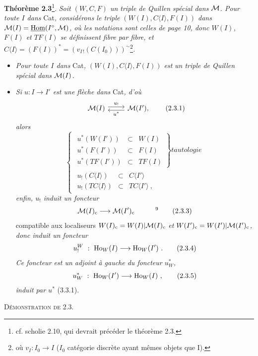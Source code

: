 \textbf{Théorème 2.3}\footnote[7]{cf. scholie 2.10, qui devrait précéder le théorème 2.3.}. \textit{Soit $(W,C,F)$ un triple de Quillen spécial dans $\mathcal{M}$. Pour toute $I$ dans} Cat\textit{, considérons le triple $(W(I),C\langle I\rangle,F(I))$ dans $\mathcal{M}(I) = \underline{\mathrm{Hom}}(I^{\circ},\mathcal{M})$, où les notations sont celles de page 10, donc $W(I)$, $F(I)$ et $TF(I)$ se définissent fibre par fibre, et $C\langle I\rangle = (F(I))^* = (v_{I\,!}(C(I_0)))^{\sim}$}\footnote[8]{où $v_I : I_0 \longrightarrow I$ ($I_0$ catégorie discrète ayant mêmes objets que I).}\textit{.}
\begin{itemize}
\item[1°)] \textit{Pour toute $I$ dans} Cat\textit{, $(W(I),C\langle I\rangle,F(I))$ est}
\textit{un triple de Quillen spécial dans $\mathcal{M}(I)$.}
\item[2°)] \textit{Si $u : I \longrightarrow I'$ est une flèche dans} Cat\textit{, d'où}
\[
\begin{tikzcd}
\M(I) \arrow[r, shift left, "u_!"] & \M(I'), \arrow[l, shift left, "u^*"]
\end{tikzcd}
\tag*{(2.3.1)}
\]
\textit{alors}
\[
\left\{
\begin{array}{l}
\left.\begin{array}{rcl}
u^*(W(I')) & \subset & W(I)\\
u^*(F(I')) & \subset & F(I)\\
u^*(TF(I')) & \subset & TF(I)
\end{array}\right\}\textit{tautologie}\\
\begin{array}{rcl}
u_!(C\langle I\rangle) & \subset & C\langle I'\rangle\\
u_!(TC\langle I\rangle) & \subset & TC\langle I'\rangle\ ,
\end{array}
\end{array}\right.
\tag*{(2.3.2)}
\]
\textit{enfin, $u_!$ induit un foncteur}
\[
\M(I)_{\cc} \longrightarrow \M(I')_{\cc} \qquad\quad \text{\footnotemark[9]}
\tag*{(2.3.3)}
\]
compatible aux localiseurs $W(I)_{\mathrm{c}} = W(I)|\mathcal{M}(I)_{\mathrm{c}}$ \textit{et} $W(I')_{\mathrm{c}} = W(I')|\mathcal{M}(I')_{\mathrm{c}}$\textit{, donc induit un foncteur}
\[
u_!^W\ :\ \Ho_W(I) \longrightarrow \Ho_W(I')\ .
\tag*{(2.3.4)}
\]
\textit{Ce foncteur est un adjoint à gauche du foncteur $u^*_W$,}
\[
u^*_W\ :\ \mathrm{Ho}_W(I') \longrightarrow \mathrm{Ho}_W(I)\ ,
\tag*{(2.3.5)}
\]
\textit{induit par $u^*$} (3.3.1). %
\end{itemize}
\textsc{Démonstration de 2.3.}

